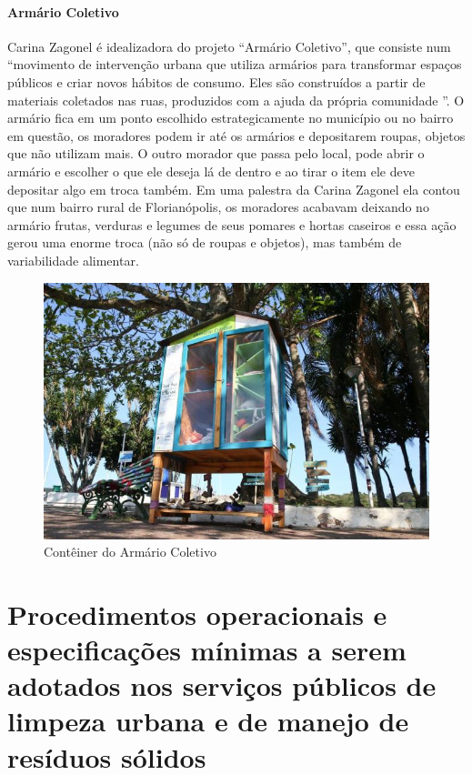\paragraph{\textbf{Armário Coletivo}}
Carina Zagonel é idealizadora do projeto “Armário Coletivo”, que consiste num “movimento de intervenção urbana que utiliza armários para transformar espaços públicos e criar novos hábitos de consumo. Eles são construídos a partir de materiais coletados nas ruas, produzidos com a ajuda da própria comunidade ”. O armário fica em um ponto escolhido estrategicamente no município ou no bairro em questão, os moradores podem ir até os armários e depositarem roupas, objetos que não utilizam mais. O outro morador que passa pelo local, pode abrir o armário e escolher o que ele deseja lá de dentro e ao tirar o item ele deve depositar algo em troca também. Em uma palestra da Carina Zagonel ela contou que num bairro rural de Florianópolis, os moradores acabavam deixando no armário frutas, verduras e legumes de seus pomares e hortas caseiros e essa ação gerou uma enorme troca (não só de roupas e objetos), mas também de variabilidade alimentar.

\begin{figure}[h]
	\centering
	\includegraphics[width=0.7\linewidth]{produtos/prodquatro/armario_coletivo}
	\caption{Contêiner do Armário Coletivo}
	\label{fig:armario_coletivo}
\end{figure}


\newpage
\FloatBarrier
\section{Procedimentos operacionais e especificações mínimas a serem adotados nos serviços públicos de limpeza urbana e de manejo de resíduos sólidos}
\label{sec:proc_oper}

